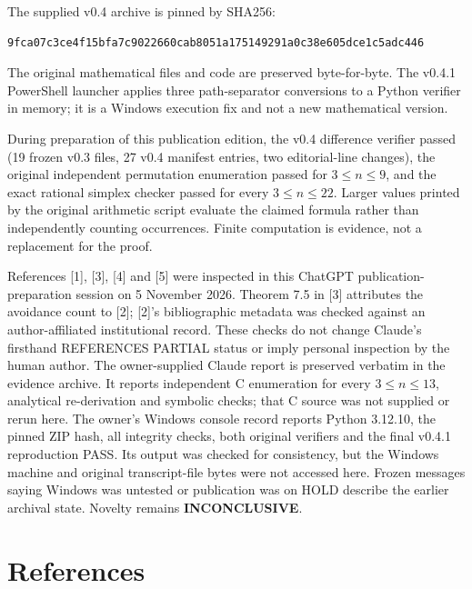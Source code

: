 \documentclass[
  11pt,
]{article}
\let\oldsection\section
\renewcommand{\section}{\needspace{5\baselineskip}\oldsection}
\begin{document}
The supplied v0.4 archive is pinned by SHA256:

\begin{verbatim}
9fca07c3ce4f15bfa7c9022660cab8051a175149291a0c38e605dce1c5adc446
\end{verbatim}

The original mathematical files and code are preserved byte-for-byte.
The v0.4.1 PowerShell launcher applies three path-separator conversions
to a Python verifier in memory; it is a Windows execution fix and not a
new mathematical version.

During preparation of this publication edition, the v0.4 difference
verifier passed (19 frozen v0.3 files, 27 v0.4 manifest entries, two
editorial-line changes), the original independent permutation
enumeration passed for \(3\leq n\leq9\), and the exact rational simplex
checker passed for every \(3\leq n\leq22\). Larger values printed by the
original arithmetic script evaluate the claimed formula rather than
independently counting occurrences. Finite computation is evidence, not
a replacement for the proof.

References {[}1{]}, {[}3{]}, {[}4{]} and {[}5{]} were inspected in this
ChatGPT publication-preparation session on 5 November 2026. Theorem 7.5
in {[}3{]} attributes the avoidance count to {[}2{]}; {[}2{]}'s
bibliographic metadata was checked against an author-affiliated
institutional record. These checks do not change Claude's firsthand
REFERENCES PARTIAL status or imply personal inspection by the human
author. The owner-supplied Claude report is preserved verbatim in the
evidence archive. It reports independent C enumeration for every
\(3\leq n\leq13\), analytical re-derivation and symbolic checks; that C
source was not supplied or rerun here. The owner's Windows console
record reports Python 3.12.10, the pinned ZIP hash, all integrity
checks, both original verifiers and the final v0.4.1 reproduction PASS.
Its output was checked for consistency, but the Windows machine and
original transcript-file bytes were not accessed here. Frozen messages
saying Windows was untested or publication was on HOLD describe the
earlier archival state. Novelty remains \textbf{INCONCLUSIVE}.

\section*{References}\label{references}
\end{document}
